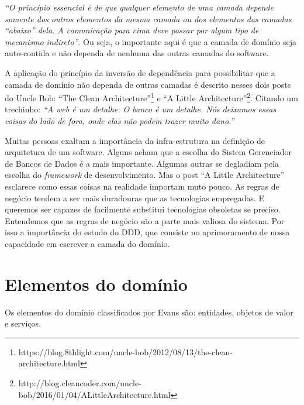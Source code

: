 \documentclass[a4paper, 12pt]{article}
\newcommand{\citacao}[1]{\emph{``#1''}}
\begin{document}
\citacao{O princípio essencial é de que qualquer elemento de uma camada depende somente dos outros elementos da mesma camada ou dos elementos das camadas ``abaixo'' dela. A comunicação para cima deve passar por algum tipo de mecanismo indireto}. Ou seja, o importante aqui é que a camada de domínio seja auto-contida e não dependa de nenhuma das outras camadas do software.

A aplicação do princípio da inversão de dependência para possibilitar que a camada de domínio não dependa de outras camadas é descrito nesses dois posts do Uncle Bob: ``The Clean Architecture''\footnote{https://blog.8thlight.com/uncle-bob/2012/08/13/the-clean-architecture.html} e ``A Little Architecture''\footnote{http://blog.cleancoder.com/uncle-bob/2016/01/04/ALittleArchitecture.html}. Citando um trechinho: \citacao{A web é um detalhe. O banco é um detalhe. Nós deixamos essas coisas do lado de fora, onde elas não podem trazer muito dano.}

Muitas pessoas exaltam a importância da infra-estrutura na definição de arquitetura de um software. Alguns acham que a escolha do Sistem Gerenciador de Bancos de Dados é a mais importante. Algumas outras se degladiam pela escolha do \emph{framework} de desenvolvimento. Mas o post ``A Little Architecture'' esclarece como essas coisas na realidade importam muto pouco. As regras de negócio tendem a ser mais duradouras que as tecnologias empregadas. E queremos ser capazes de facilmente substitui tecnologias obsoletas se preciso. Entendemos que as regras de negócio são a parte mais valiosa do sistema. Por isso a importância do estudo do DDD, que consiste no aprimoramento de nossa capacidade em escrever a camada do domínio.


\section{Elementos do domínio}

Os elementos do domínio classificados por Evans são: entidades, objetos de valor e serviços.
\end{document}
